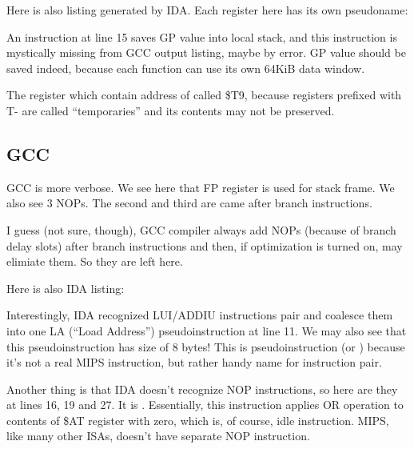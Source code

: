 Here is also listing generated by IDA. Each register here has its own pseudoname:



An instruction at line 15 saves GP value into local stack, and this instruction is mystically missing
from GCC output listing, maybe by error.
GP value should be saved indeed, because each function can use its own 64KiB data window.

The register which contain address of \puts called \$T9, because registers prefixed with T- are called
``temporaries'' and its contents may not be preserved.

\subsection{\NonOptimizing GCC}



\NonOptimizing GCC is more verbose.
We see here that FP register is used for stack frame.
We also see 3 \ac{NOP}s.
The second and third are came after branch instructions.

I guess (not sure, though), GCC compiler always add \ac{NOP}s (because of branch delay slots) after branch
instructions and then, if optimization is turned on, may elimiate them.
So they are left here.

Here is also IDA listing:



Interestingly, IDA recognized LUI/ADDIU instructions pair and coalesce them into one 
LA (``Load Address'') pseudoinstruction at line 11.
We may also see that this pseudoinstruction has size of 8 bytes!
This is pseudoinstruction (or ) because it's not a real MIPS instruction, but rather
handy name for instruction pair.

Another thing is that IDA doesn't recognize \ac{NOP} instructions, so here are they at lines 16, 19 and 27.
It is . Essentially, this instruction applies OR operation to contents of \$AT register
with zero, which is, of course, idle instruction. 
MIPS, like many other \ac{ISA}s, doesn't have separate \ac{NOP} instruction.

